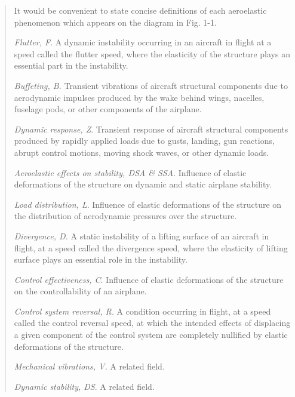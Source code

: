 \documentclass{AeroStructure-ERJohnson}
\begin{document}
\begin{quote}
\clearpage

{\def\thefigure{12.1}
}
\vspace*{-2\baselineskip}

It would be convenient to state concise definitions of each aeroelastic phenomenon which appears on the diagram in Fig. 1-1.

\textit{Flutter, F}. A dynamic instability occurring in an aircraft in flight at a speed called the flutter speed, where the elasticity of the structure plays an essential part in the instability.

\textit{Buffeting, B. }Transient vibrations of aircraft structural components due to aerodynamic impulses produced by the wake behind wings, nacelles, fuselage pods, or other components of the airplane.

\textit{Dynamic response, Z}. Transient response of aircraft structural components produced by rapidly applied loads due to gusts, landing, gun reactions, abrupt control motions, moving shock waves, or other dynamic loads.

\textit{Aeroelastic effects on stability, DSA \& SSA}. Influence of elastic deformations of the structure on dynamic and static airplane stability.

\textit{Load distribution, L}. Influence of elastic deformations of the structure on the distribution of aerodynamic pressures over the structure.

\textit{Divergence, D.} A static instability of a lifting surface of an aircraft in flight, at a speed called the divergence speed, where the elasticity of lifting surface plays an essential role in the instability.

\textit{Control effectiveness, C}. Influence of elastic deformations of the structure on the controllability of an airplane.

\textit{Control system reversal, R.} A condition occurring in flight, at a speed called the control reversal speed, at which the intended effects of displacing a given component of the control system are completely nullified by elastic deformations of the structure.

\textit{Mechanical vibrations, V.} A related field.

\textit{Dynamic stability, DS}. A related field.
\end{quote}
\end{document}
